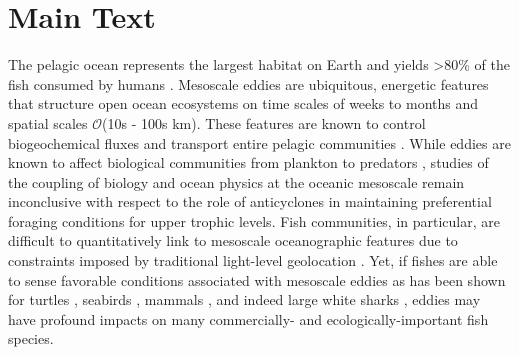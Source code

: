 \clearpage
\section{Main Text} 


The pelagic ocean represents the largest habitat on Earth \citep[99\% of the biosphere][]{Game2009} and yields >80\% of the fish consumed by humans \citep{Game2009,Pauly2002}. Mesoscale eddies are ubiquitous, energetic features that structure open ocean ecosystems \citep{McGillicuddy2016} on time scales of weeks to months and spatial scales $\mathcal{O}$(10s - 100s km). These features are known to control biogeochemical fluxes and transport entire pelagic communities \citep{Chelton2011}. While eddies are known to affect biological communities from plankton \citep{McGillicuddy2007, benitez2007mesoscale} to predators \citep{Bailleul2010,Gaube2018}, studies of the coupling of biology and ocean physics at the oceanic mesoscale remain inconclusive with respect to the role of anticyclones in maintaining preferential foraging conditions for upper trophic levels. Fish communities, in particular, are difficult to quantitatively link to mesoscale oceanographic features due to constraints imposed by traditional light-level geolocation \citep[][Chapter \ref{chap:2}]{Braun2018a}. Yet, if fishes are able to sense favorable conditions associated with mesoscale eddies as has been shown for turtles \citep{Gaube2017, Kobayashi2011}, seabirds \citep{TewKai2009}, mammals \citep{Bailleul2010}, and indeed large white sharks \citep{Gaube2018}, eddies may have profound impacts on many commercially- and ecologically-important fish species.

